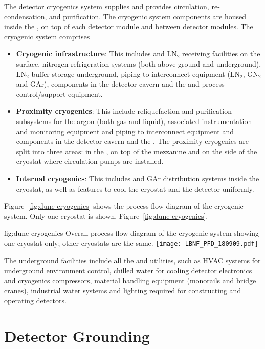 The detector cryogenics system supplies  and provides
circulation, re-condensation, and purification. The cryogenic system
components are housed inside the , on top of each detector module
and between detector modules. The cryogenic system comprises
\begin{itemize}
\item {\bf Cryogenic infrastructure}: This includes  and LN$_2$ receiving
  facilities on the surface, nitrogen refrigeration systems (both
  above ground and underground), LN$_2$ buffer storage
  underground, piping to interconnect equipment (LN$_2$, GN$_2$ and GAr),
  components in the detector cavern and the  and process control/support
  equipment.
\item {\bf Proximity cryogenics}: This include reliquefaction  and
  purification subsystems for the argon (both gas and liquid), associated
  instrumentation and monitoring equipment and  piping to
  interconnect equipment and components in the detector cavern and the
  . The proximity cryogenics are split into three areas: in the
  , on top of the mezzanine and on the side of the cryostat 
  where  circulation pumps are installed.
\item {\bf Internal cryogenics}: This includes  and GAr distribution
  systems inside the cryostat, as well as features to cool the
  cryostat and the detector uniformly.
\end{itemize}
Figure~\ref{fig:dune-cryogenics} shows the process flow diagram of the
 cryogenic system. Only one cryostat is shown.
Figure~\ref{fig:dune-cryogenics}.
\begin{dunefigure}{fig:dune-cryogenics}
  {Overall process flow diagram of the cryogenic system showing one
    cryostat only; other cryostats are the same.}
  \texttt{[image: LBNF\_PFD\_180909.pdf]}
\end{dunefigure}


The underground facilities include all the  and utilities,
such as HVAC systems for underground environment control, chilled
water for cooling detector electronics and cryogenics compressors,
material handling equipment (monorails and bridge cranes), industrial
water systems and lighting required for constructing and operating
detectors.


\section{Detector Grounding}
\label{sec:fdsp-coord-faci-grounding}


